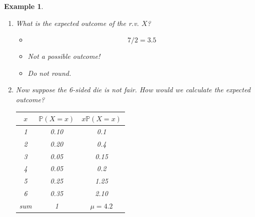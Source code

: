 \documentclass[12pt]{amsart}
\newtheorem{example}[theorem]{Example}
\begin{document}
{\begin{example}
\begin{enumerate}
\item  What is the expected outcome of the r.v. $X$?

\color{blue}
\begin{itemize}
\item $$7/2 = 3.5$$
\item Not a possible outcome! 
\item Do not round.
\end{itemize}

\color{black}


\vspace{4cm}

\item Now suppose the 6-sided die is not fair. How would we calculate the expected outcome?



\color{blue}
\vspace{1cm}
\begin{tabular}{| c | c | c |}
  \hline                       
  $x$ & $\mathbb{P}(X=x)$ & $x\mathbb{P}(X=x)$ \\
   \hline     
  1 & 0.10 & 0.1\\
  2 & 0.20  & 0.4\\
  3 & 0.05  & 0.15\\
  4 & 0.05  & 0.2\\
  5 & 0.25  & 1.25\\
  6 & 0.35  & 2.10\\
   \hline   
   sum & 1 & $\mu = 4.2$ \\
  \hline  
\end{tabular}
\color{black}

\vspace{2cm}
\end{enumerate}
\end{example} 

\newpage


}
\end{document}
